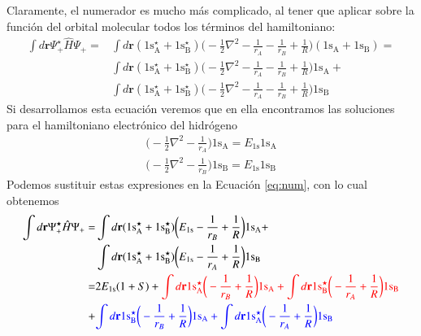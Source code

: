 \documentclass[notitlepage, amsmath,amssymb,
 aps,12pt,tightenlines]{revtex4-1}
\begin{document}
Claramente, el numerador es mucho más complicado, al tener que
aplicar sobre la función del orbital molecular todos los términos
del hamiltoniano:
\begin{equation}
    \begin{split}
        \int d\mathbf{r}\Psi_+^\star\hat{H}\Psi_+=&
       \int d\mathbf{r}(1\mathrm{s^\star_A}+1\mathrm{s^\star_B})\bigg( -\frac{1}{2}\nabla^2 -
    \frac{1}{r_A} - 
    \frac{1}{r_B} +
    \frac{1}{R}\bigg)(1\mathrm{s_A}+1\mathrm{s_B}) = \\
    & \int d\mathbf{r}(1\mathrm{s^\star_A}+1\mathrm{s^\star_B})\bigg( -\frac{1}{2}\nabla^2 -
    \frac{1}{r_A} - 
    \frac{1}{r_B} +
    \frac{1}{R}\bigg)1\mathrm{s_A} + \\
    & \int d\mathbf{r}(1\mathrm{s^\star_A}+1\mathrm{s^\star_B})\bigg( -\frac{1}{2}\nabla^2 -
    \frac{1}{r_A} - 
    \frac{1}{r_B} +
    \frac{1}{R}\bigg)1\mathrm{s_B}
    \end{split}
    \label{eq:num}
\end{equation}
Si desarrollamos esta ecuación veremos que en ella encontramos
las soluciones para el hamiltoniano electrónico del hidrógeno
\begin{align}
    \bigg( -\frac{1}{2}\nabla^2 - \frac{1}{r_A}\bigg)1\mathrm{s_A}=E_\mathrm{1s}1\mathrm{s_A}\\
    \bigg( -\frac{1}{2}\nabla^2 - \frac{1}{r_B}\bigg)1\mathrm{s_B}=E_\mathrm{1s}1\mathrm{s_B}
\end{align}
Podemos sustituir estas expresiones en la Ecuación 
\ref{eq:num}, con lo cual obtenemos 
\begin{equation}
\begin{split}
    \int d\mathbf{r}\Psi_+^\star\hat{H}\Psi_+=
     & \int d\mathbf{r}
     (1\mathrm{s^\star_A} + 1\mathrm{s^\star_B})
     \bigg( E_\mathrm{1s} - \frac{1}{r_B} +\frac{1}{R}\bigg)
     1\mathrm{s_A} + \\
     & \int d\mathbf{r}(1\mathrm{s^\star_A}+1\mathrm{s^\star_B})
     \bigg( E_\mathrm{1s} - \frac{1}{r_A}  +\frac{1}{R}\bigg)
     1\mathrm{s_B} \\
     = & 2E_\mathrm{1s}(1 + S) + 
     \color{red}{\int d\mathbf{r} 1\mathrm{s^\star_A} \bigg(-\frac{1}{r_B}+\frac{1}{R}\bigg) 1\mathrm{s_A}}
     +
     \int d\mathbf{r} 1\mathrm{s^\star_B} \bigg(-\frac{1}{r_A}+\frac{1}{R}\bigg) 1\mathrm{s_B}
     \\
     + & {\color{blue}\int d\mathbf{r} 1\mathrm{s^\star_B} \bigg(-\frac{1}{r_B}+\frac{1}{R}\bigg) 1\mathrm{s_A} 
     +  \int d\mathbf{r} 1\mathrm{s^\star_A}   
     \bigg(-\frac{1}{r_A}+\frac{1}{R}\bigg) 1\mathrm{s_B}}
\end{split}
\label{eq:num2}
\end{equation}
\end{document}
